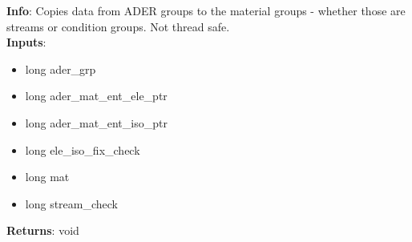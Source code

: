 \textbf{Info}: Copies data from ADER groups to the material groups - whether
those are streams or condition groups. Not thread safe.\\

\noindent \textbf{Inputs}:
\begin{itemize}
\item{long ader\_grp}
\item{long ader\_mat\_ent\_ele\_ptr}
\item{long ader\_mat\_ent\_iso\_ptr}
\item{long ele\_iso\_fix\_check}
\item{long mat}
\item{long stream\_check}
\end{itemize}

\noindent \textbf{Returns}: void
